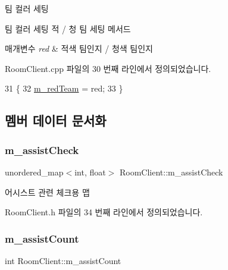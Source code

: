 팀 컬러 세팅 

팀 컬러 세팅  적 / 청 팀 세팅 메서드


\begin{DoxyParams}{매개변수}
{\em red} & 적색 팀인지 / 청색 팀인지 \\
\hline
\end{DoxyParams}


Room\+Client.\+cpp 파일의 30 번째 라인에서 정의되었습니다.


\begin{DoxyCode}
31 \{
32     \hyperlink{class_room_client_a4552bc59af3cf8137a506cdfbe7540cb}{m\_redTeam} = red;
33 \}
\end{DoxyCode}


\subsection{멤버 데이터 문서화}
\mbox{\label{class_room_client_a9f63a98f8a902a52bf272f23af3e5f82}} 
\subsubsection{\texorpdfstring{m\+\_\+assist\+Check}{m\_assistCheck}}
{\footnotesize\ttfamily unordered\+\_\+map$<$int, float$>$ Room\+Client\+::m\+\_\+assist\+Check\hspace{0.3cm}{\ttfamily [private]}}



어시스트 관련 체크용 맵 



Room\+Client.\+h 파일의 34 번째 라인에서 정의되었습니다.

\mbox{\label{class_room_client_adacb97c1fec85cb0efef063dc43073f5}} 
\subsubsection{\texorpdfstring{m\+\_\+assist\+Count}{m\_assistCount}}
{\footnotesize\ttfamily int Room\+Client\+::m\+\_\+assist\+Count\hspace{0.3cm}{\ttfamily [private]}}



